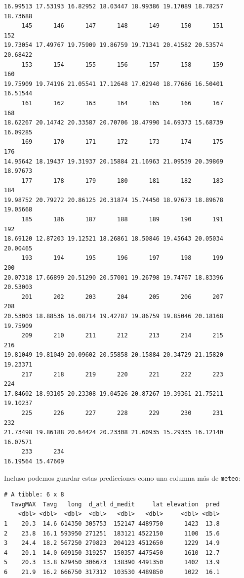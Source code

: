 \documentclass[
  letterpaper,
  DIV=11,
  numbers=noendperiod]{scrreprt}
\newenvironment{Shaded}{\begin{snugshade}}{\end{snugshade}}
\newcommand{\FunctionTok}[1]{\textcolor[rgb]{0.28,0.35,0.67}{#1}}
\newcommand{\NormalTok}[1]{\textcolor[rgb]{0.00,0.23,0.31}{#1}}
\newcommand{\OtherTok}[1]{\textcolor[rgb]{0.00,0.23,0.31}{#1}}
\newcommand{\SpecialCharTok}[1]{\textcolor[rgb]{0.37,0.37,0.37}{#1}}
\begin{document}
\begin{verbatim}
16.99513 17.53193 16.82952 18.03447 18.99386 19.17089 18.78257 18.73688 
     145      146      147      148      149      150      151      152 
19.73054 17.49767 19.75909 19.86759 19.71341 20.41582 20.53574 20.68422 
     153      154      155      156      157      158      159      160 
19.75909 19.74196 21.05541 17.12648 17.02940 18.77686 16.50401 16.51544 
     161      162      163      164      165      166      167      168 
18.62267 20.14742 20.33587 20.70706 18.47990 14.69373 15.68739 16.09285 
     169      170      171      172      173      174      175      176 
14.95642 18.19437 19.31937 20.15884 21.16963 21.09539 20.39869 18.97673 
     177      178      179      180      181      182      183      184 
19.98752 20.79272 20.86125 20.31874 15.74450 18.97673 18.89678 19.05668 
     185      186      187      188      189      190      191      192 
18.69120 12.87203 19.12521 18.26861 18.50846 19.45643 20.05034 20.00465 
     193      194      195      196      197      198      199      200 
20.07318 17.66899 20.51290 20.57001 19.26798 19.74767 18.83396 20.53003 
     201      202      203      204      205      206      207      208 
20.53003 18.88536 16.08714 19.42787 19.86759 19.85046 20.18168 19.75909 
     209      210      211      212      213      214      215      216 
19.81049 19.81049 20.09602 20.55858 20.15884 20.34729 21.15820 19.23371 
     217      218      219      220      221      222      223      224 
17.84602 18.93105 20.23308 19.04526 20.87267 19.39361 21.75211 19.10237 
     225      226      227      228      229      230      231      232 
21.73498 19.86188 20.64424 20.23308 21.60935 15.29335 16.12140 16.07571 
     233      234 
16.19564 15.47609 
\end{verbatim}

Incluso podemos guardar estas predicciones como una columna más de
\texttt{meteo}:

\begin{Shaded}
\end{Shaded}

\begin{verbatim}
# A tibble: 6 x 8
  TavgMAX  Tavg   long  d_atl d_medit     lat elevation  pred
    <dbl> <dbl>  <dbl>  <dbl>   <dbl>   <dbl>     <dbl> <dbl>
1    20.3  14.6 614350 305753  152147 4489750      1423  13.8
2    23.8  16.1 593950 271251  183121 4522150      1100  15.6
3    24.4  18.2 567250 279823  204123 4512650      1229  14.9
4    20.1  14.0 609150 319257  150357 4475450      1610  12.7
5    20.3  13.8 629450 306673  138390 4491350      1402  13.9
6    21.9  16.2 666750 317312  103530 4489850      1022  16.1
\end{verbatim}
\end{document}
